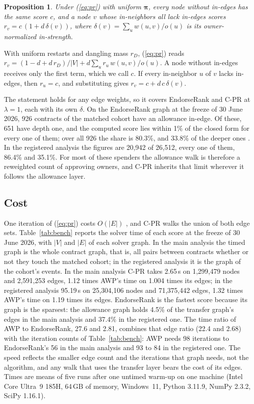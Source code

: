 \documentclass{ieeeaccess}
\newtheorem{proposition}{Proposition}
\newcommand{\cpr}{\mbox{C-PR}}
\begin{document}
\begin{proposition}
\label{prop:closed}
Under (\ref{eq:pr}) with uniform $\boldsymbol\pi$, every node without in-edges has the same score $c$, and a node $v$ whose in-neighbors all lack in-edges scores $r_v=c\,(1+d\,\delta(v))$, where $\delta(v)=\sum_u w(u,v)/o(u)$ is its owner-normalized in-strength.
\end{proposition}

\begin{IEEEproof}
With uniform restarts and dangling mass $r_D$, (\ref{eq:pr}) reads $r_v=(1-d+d\,r_D)/|V|+d\sum_u r_u\,w(u,v)/o(u)$. A node without in-edges receives only the first term, which we call $c$. If every in-neighbor $u$ of $v$ lacks in-edges, then $r_u=c$, and substituting gives $r_v=c+d\,c\,\delta(v)$.
\end{IEEEproof}

The statement holds for any edge weights, so it covers EndorseRank and \cpr{} at $\lambda=1$, each with its own $\delta$. On the EndorseRank graph at the freeze of 30 June 2026, 926 contracts of the matched cohort have an allowance in-edge. Of these, 651 have depth one, and the computed score lies within 1\% of the closed form for every one of them; over all 926 the share is 80.3\%, and 33.8\% of the deeper ones \cite{kwon2026companion}. In the registered analysis the figures are 20,942 of 26,512, every one of them, 86.4\% and 35.1\%. For most of these spenders the allowance walk is therefore a reweighted count of approving owners, and \cpr{} inherits that limit wherever it follows the allowance layer.

\subsection{Cost}
\label{sec:cost}
One iteration of (\ref{eq:pr}) costs $O(|E|)$ \cite{leskovec2020mining}, and \cpr{} walks the union of both edge sets. Table~\ref{tab:bench} reports the solver time of each score at the freeze of 30 June 2026, with $|V|$ and $|E|$ of each solver graph. In the main analysis the timed graph is the whole contract graph, that is, all pairs between contracts whether or not they touch the matched cohort; in the registered analysis it is the graph of the cohort's events. In the main analysis \cpr{} takes 2.65\,s on 1,299,479 nodes and 2,591,253 edges, 1.12 times AWP's time on 1.004 times its edges; in the registered analysis 95.19\,s on 25,304,106 nodes and 71,375,442 edges, 1.32 times AWP's time on 1.19 times its edges. EndorseRank is the fastest score because its graph is the sparsest: the allowance graph holds 4.5\% of the transfer graph's edges in the main analysis and 37.4\% in the registered one. The time ratio of AWP to EndorseRank, 27.6 and 2.81, combines that edge ratio (22.4 and 2.68) with the iteration counts of Table~\ref{tab:bench}: AWP needs 98 iterations to EndorseRank's 56 in the main analysis and 93 to 84 in the registered one. The speed reflects the smaller edge count and the iterations that graph needs, not the algorithm, and any walk that uses the transfer layer bears the cost of its edges. Times are means of five runs after one untimed warm-up on one machine (Intel Core Ultra~9 185H, 64\,GB of memory, Windows~11, Python 3.11.9, NumPy 2.3.2, SciPy 1.16.1).
\end{document}
